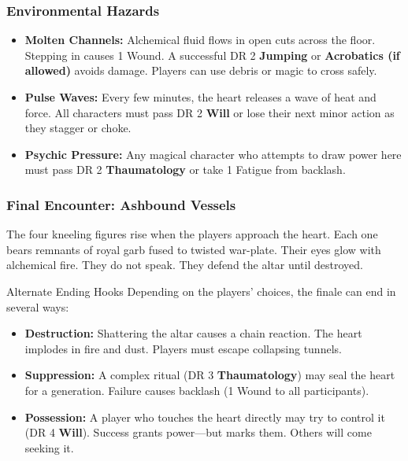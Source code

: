 \subsubsection*{Environmental Hazards}
\begin{itemize}
    \item \textbf{Molten Channels:} Alchemical fluid flows in open cuts across the floor. Stepping in causes 1 Wound. A successful DR 2 \textbf{Jumping} or \textbf{Acrobatics (if allowed)} avoids damage. Players can use debris or magic to cross safely.

    \item \textbf{Pulse Waves:} Every few minutes, the heart releases a wave of heat and force. All characters must pass DR 2 \textbf{Will} or lose their next minor action as they stagger or choke.

    \item \textbf{Psychic Pressure:} Any magical character who attempts to draw power here must pass DR 2 \textbf{Thaumatology} or take 1 Fatigue from backlash.
\end{itemize}

\subsubsection*{Final Encounter: Ashbound Vessels}

The four kneeling figures rise when the players approach the heart. Each one bears remnants of royal garb fused to twisted war-plate. Their eyes glow with alchemical fire. They do not speak. They defend the altar until destroyed.


\begin{CommentBox}{Alternate Ending Hooks}
    Depending on the players’ choices, the finale can end in several ways:
    \begin{itemize}
        \item \textbf{Destruction:} Shattering the altar causes a chain reaction. The heart implodes in fire and dust. Players must escape collapsing tunnels.
        
        \item \textbf{Suppression:} A complex ritual (DR 3 \textbf{Thaumatology}) may seal the heart for a generation. Failure causes backlash (1 Wound to all participants).
        
        \item \textbf{Possession:} A player who touches the heart directly may try to control it (DR 4 \textbf{Will}). Success grants power—but marks them. Others will come seeking it.
    \end{itemize}
\end{CommentBox}


